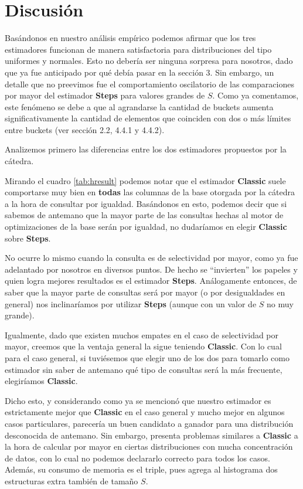 \section{Discusión}
Basándonos en nuestro análisis empírico podemos afirmar que los tres estimadores funcionan de manera satisfactoria para distribuciones del tipo uniformes y normales. Esto no debería ser ninguna sorpresa para nosotros, dado que ya fue anticipado por qué debía pasar en la sección 3. Sin embargo, un detalle que no preevimos fue el comportamiento oscilatorio de las comparaciones por mayor del estimador \textbf{Steps} para valores grandes de $S$. Como ya comentamos, este fenómeno se debe a que al agrandarse la cantidad de buckets aumenta significativamente la cantidad de elementos que coinciden con dos o más límites entre buckets (ver sección 2.2, 4.4.1 y 4.4.2).

Analizemos primero las diferencias entre los dos estimadores propuestos por la cátedra.

Mirando el cuadro \ref{tab:hresult} podemos notar que el estimador \textbf{Classic} suele comportarse muy bien en \textbf{todas} las columnas de la base otorgada por la cátedra a la hora de consultar por igualdad. Basándonos en esto, podemos decir que si sabemos de antemano que la mayor parte de las consultas hechas al motor de optimizaciones de la base serán por igualdad, no dudaríamos en elegir \textbf{Classic} sobre \textbf{Steps}.

No ocurre lo mismo cuando la consulta es de selectividad por mayor, como ya fue adelantado por nosotros en diversos puntos. De hecho se ``invierten'' los papeles y quien logra mejores resultados es el estimador \textbf{Steps}. Análogamente entonces, de saber que la mayor parte de consultas será por mayor (o por desigualdades en general) nos inclinaríamos por utilizar \textbf{Steps} (aunque con un valor de $S$ no muy grande).

Igualmente, dado que existen muchos empates en el caso de selectividad por mayor, creemos que la ventaja general la sigue teniendo \textbf{Classic}. Con lo cual para el caso general, si tuviésemos que elegir uno de los dos para tomarlo como estimador sin saber de antemano qué tipo de consultas será la más frecuente, elegiríamos \textbf{Classic}.

Dicho esto, y considerando como ya se mencionó que nuestro estimador es estrictamente mejor que \textbf{Classic} en el caso general y mucho mejor en algunos casos particulares, parecería un buen candidato a ganador para una distribución desconocida de antemano. Sin embargo, presenta problemas similares a \textbf{Classic} a la hora de calcular por mayor en ciertas distribuciones con mucha concentración de datos, con lo cual no podemos declararlo correcto para todos los casos. Además, su consumo de memoria es el triple, pues agrega al histograma dos estructuras extra también de tamaño $S$.

